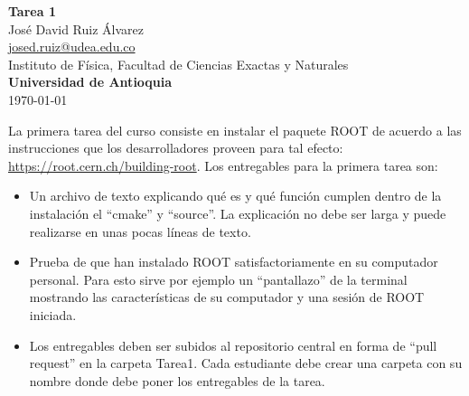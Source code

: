 \documentclass[10.5pt]{article}
\begin{document}
\noindent
\begin{minipage}[b]{0.75\linewidth}
{\LARGE\bf Tarea 1}\\ %
\large{Jos\'{e} David Ruiz \'{A}lvarez} \\
\small{\href{mailto:josed.ruiz@udea.edu.co}{josed.ruiz@udea.edu.co}} \\ %
\normalsize{Instituto de Física, Facultad de Ciencias Exactas y Naturales} \\%
\normalsize{\bf Universidad de Antioquia} \\[8mm]
\today %
\end{minipage}%



La primera tarea del curso consiste en instalar el paquete ROOT de acuerdo a las instrucciones que los desarrolladores proveen para tal efecto: \url{https://root.cern.ch/building-root}. Los entregables para la primera tarea son:

\begin{itemize}
\item Un archivo de texto explicando qué es y qué función cumplen dentro de la instalación el ``cmake'' y ``source''. La explicación no debe ser larga y puede realizarse en unas pocas líneas de texto.
\item Prueba de que han instalado ROOT satisfactoriamente en su computador personal. Para esto sirve por ejemplo un ``pantallazo'' de la terminal mostrando las características de su computador y una sesión de ROOT iniciada.
\item Los entregables deben ser subidos al repositorio central en forma de ``pull request'' en la carpeta Tarea1. Cada estudiante debe crear una carpeta con su nombre donde debe poner los entregables de la tarea.
\end{itemize}
\end{document}
